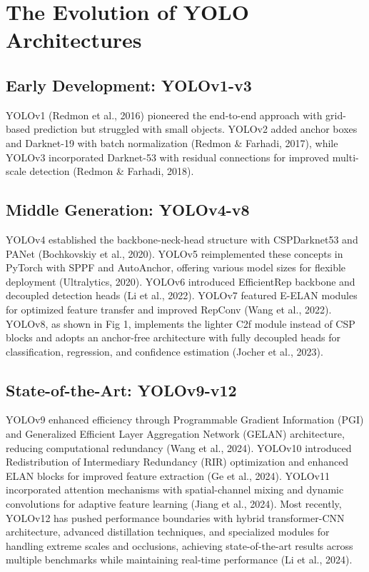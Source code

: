 \documentclass[11pt]{article}
\begin{document}
\section{The Evolution of YOLO Architectures}
\subsection{Early Development: YOLOv1-v3}
YOLOv1 (Redmon et al., 2016) pioneered the end-to-end approach with grid-based prediction but struggled with small objects. YOLOv2 added anchor boxes and Darknet-19 with batch normalization (Redmon \& Farhadi, 2017), while YOLOv3 incorporated Darknet-53 with residual connections for improved multi-scale detection (Redmon \& Farhadi, 2018).

\subsection{Middle Generation: YOLOv4-v8}
YOLOv4 established the backbone-neck-head structure with CSPDarknet53 and PANet (Bochkovskiy et al., 2020). YOLOv5 reimplemented these concepts in PyTorch with SPPF and AutoAnchor, offering various model sizes for flexible deployment (Ultralytics, 2020). YOLOv6 introduced EfficientRep backbone and decoupled detection heads (Li et al., 2022). YOLOv7 featured E-ELAN modules for optimized feature transfer and improved RepConv (Wang et al., 2022). YOLOv8, as shown in Fig 1, implements the lighter C2f module instead of CSP blocks and adopts an anchor-free architecture with fully decoupled heads for classification, regression, and confidence estimation (Jocher et al., 2023).

\subsection{State-of-the-Art: YOLOv9-v12}
YOLOv9 enhanced efficiency through Programmable Gradient Information (PGI) and Generalized Efficient Layer Aggregation Network (GELAN) architecture, reducing computational redundancy (Wang et al., 2024). YOLOv10 introduced Redistribution of Intermediary Redundancy (RIR) optimization and enhanced ELAN blocks for improved feature extraction (Ge et al., 2024). YOLOv11 incorporated attention mechanisms with spatial-channel mixing and dynamic convolutions for adaptive feature learning (Jiang et al., 2024). Most recently, YOLOv12 has pushed performance boundaries with hybrid transformer-CNN architecture, advanced distillation techniques, and specialized modules for handling extreme scales and occlusions, achieving state-of-the-art results across multiple benchmarks while maintaining real-time performance (Li et al., 2024).
\end{document}
